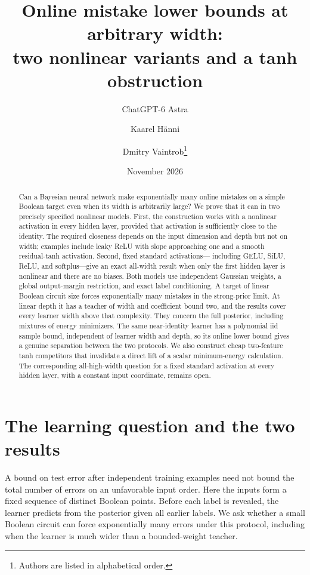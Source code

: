 \documentclass[11pt]{article}
\title{Online mistake lower bounds at arbitrary width:\\two nonlinear variants and a tanh obstruction}
\author{ChatGPT-6 Astra \and Kaarel H\"anni \and Dmitry Vaintrob\thanks{Authors are listed in alphabetical order.}}
\date{November 2026}
\theoremstyle{remark}\newtheorem{remark}[theorem]{Remark}
\begin{document}
\maketitle
\begin{abstract}
Can a Bayesian neural network make exponentially many online mistakes
on a simple Boolean target even when its width is arbitrarily large?
We prove that it can in two precisely specified nonlinear models.
First, the construction works with a nonlinear activation in every hidden
layer, provided that activation is sufficiently close to the identity.
The required closeness depends on the input dimension and depth but not
on width; examples include leaky ReLU with slope approaching one and a
smooth residual-tanh activation. Second, fixed standard activations---
including GELU, SiLU, ReLU, and softplus---give an exact all-width result
when only the first hidden layer is nonlinear and there are no biases.
Both models use independent Gaussian weights, a global output-margin
restriction, and exact label conditioning. A target of linear Boolean
circuit size forces exponentially many mistakes in the strong-prior
limit. At linear depth it has a teacher of width and coefficient bound
two, and the results cover every learner width above that complexity.
They concern the full posterior, including mixtures of energy minimizers.
The same near-identity learner has a polynomial iid sample bound,
independent of learner width and depth, so its online lower bound gives
a genuine separation between the two protocols.
We also construct cheap two-feature tanh competitors that invalidate a
direct lift of a scalar minimum-energy calculation. The corresponding
all-high-width question for a fixed standard activation at every hidden
layer, with a constant input coordinate, remains open.
\end{abstract}

\section{The learning question and the two results}

A bound on test error after independent training examples need not bound
the total number of errors on an unfavorable input order. Here the inputs
form a fixed sequence of distinct Boolean points. Before each label is
revealed, the learner predicts from the posterior given all earlier labels.
We ask whether a small Boolean circuit can force exponentially many errors
under this protocol, including when the learner is much wider than a
bounded-weight teacher.
\end{document}
